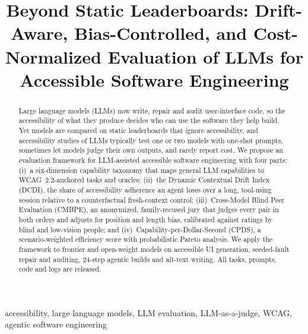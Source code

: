 \documentclass[10pt,conference]{IEEEtran}
\begin{document}
\title{Beyond Static Leaderboards: Drift-Aware, Bias-Controlled, and Cost-Normalized Evaluation of LLMs for Accessible Software Engineering}

\author{
}

\maketitle

\begin{abstract}
Large language models (LLMs) now write, repair and audit user-interface code, so the accessibility of what they produce decides who can use the software they help build. Yet models are compared on static leaderboards that ignore accessibility, and accessibility studies of LLMs typically test one or two models with one-shot prompts, sometimes let models judge their own outputs, and rarely report cost. We propose an evaluation framework for LLM-assisted accessible software engineering with four parts: (i)~a six-dimension capability taxonomy that maps general LLM capabilities to WCAG~2.2-anchored tasks and oracles; (ii)~the Dynamic Contextual Drift Index (DCDI), the share of accessibility adherence an agent loses over a long, tool-using session relative to a counterfactual fresh-context control; (iii)~Cross-Model Blind Peer Evaluation (CMBPE), an anonymized, family-recused jury that judges every pair in both orders and adjusts for position and length bias, calibrated against ratings by blind and low-vision people; and (iv)~Capability-per-Dollar-Second (CPDS), a scenario-weighted efficiency score with probabilistic Pareto analysis. We apply the framework to  frontier and open-weight models on accessible UI generation, seeded-fault repair and auditing, 24-step agentic builds and alt-text writing.  All tasks, prompts, code and logs are released.
\end{abstract}

\begin{IEEEkeywords}
accessibility, large language models, LLM evaluation, LLM-as-a-judge, WCAG, agentic software engineering
\end{IEEEkeywords}

\end{document}
